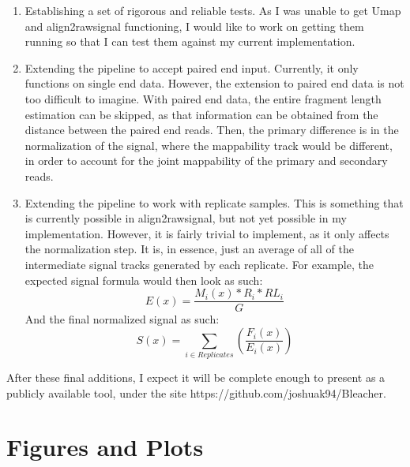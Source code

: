 \documentclass[a4paper]{article}
\begin{document}
  \begin{enumerate}
    \item Establishing a set of rigorous and reliable tests. As I was unable to get Umap and align2rawsignal functioning,
          I would like to work on getting them running so that I can test them against my current implementation.
    \item Extending the pipeline to accept paired end input. Currently, it only functions on single end data. However,
          the extension to paired end data is not too difficult to imagine. With paired end data, the entire fragment
          length estimation can be skipped, as that information can be obtained from the distance between the paired
          end reads. Then, the primary difference is in the normalization of the signal, where the mappability track
          would be different, in order to account for the joint mappability of the primary and secondary reads.
    \item Extending the pipeline to work with replicate samples. This is something that is currently possible in
          align2rawsignal, but not yet possible in my implementation. However, it is fairly trivial to implement, as it
          only affects the normalization step. It is, in essence, just an average of all of the intermediate signal
          tracks generated by each replicate. For example, the expected signal formula would then look as such:
          \begin{equation}
            \label{eq:4}
            E(x) = \frac{M_i(x)*R_i*RL_i}{G}
          \end{equation}
          And the final normalized signal as such:
          \begin{equation}
            \label{eq:5}
            S(x) = \sum_{i \in Replicates}\left(\frac{F_i(x)}{E_i(x)}\right)
          \end{equation}
  \end{enumerate}

  After these final additions, I expect it will be complete enough to present as a publicly available tool, under the
  site https://github.com/joshuak94/Bleacher.

  {}
  

  \newpage
  \section{Figures and Plots}
\end{document}

